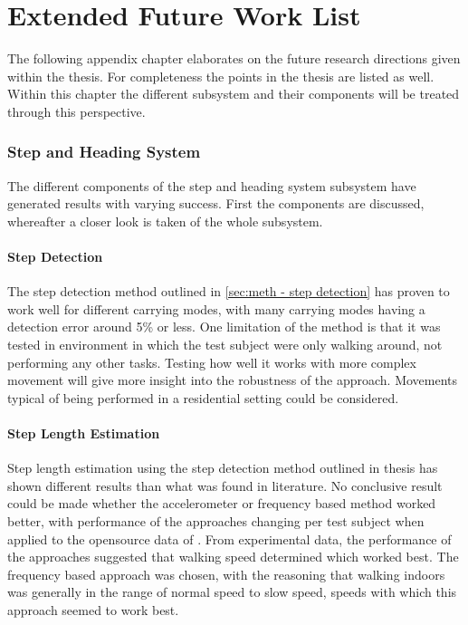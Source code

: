 \chapter{Extended Future Work List}
\label{chap:app-extended_future_work}
The following appendix chapter elaborates on the future research directions given within the thesis. For completeness the points in the thesis are listed as well. Within this chapter the different subsystem and their components will be treated through this perspective.

\subsection{Step and Heading System }

The different components of the step and heading system subsystem have generated results with varying success. First the components are discussed, whereafter a closer look is taken of the whole subsystem.

\subsubsection*{Step Detection}

The step detection method outlined in \cref{sec:meth - step detection} has proven to work well for different carrying modes, with many carrying modes having a detection error around 5\% or less. One limitation of the method is that it was tested in environment in which the test subject were only walking around, not performing any other tasks. Testing how well it works with more complex movement will give more insight into the robustness of the approach. Movements typical of being performed in a residential setting could be considered.

\subsubsection*{Step Length Estimation}

Step length estimation using the step detection method outlined in thesis has shown different results than what was found in literature. No conclusive result could be made whether the accelerometer or frequency based method worked better, with performance of the approaches changing per test subject when applied to the opensource data of \citet{Vezocnik2019}. From experimental data, the performance of the approaches suggested that walking speed determined which worked best. The frequency based approach was chosen, with the reasoning that walking indoors was generally in the range of normal speed to slow speed, speeds with which this approach seemed to work best. \par 


